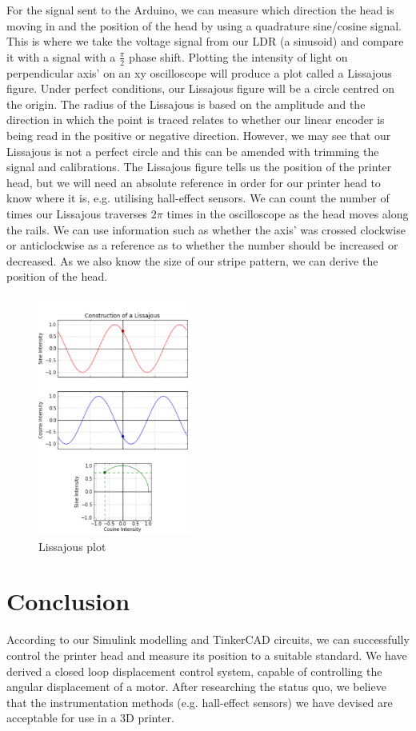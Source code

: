 \documentclass[conference]{IEEEtran}
\begin{document}
For the signal sent to the Arduino, we can measure which direction the head is moving in and the position of the head by using a quadrature sine/cosine signal. This is where we take the voltage signal from our LDR (a sinusoid) and compare it with a signal with a $\frac{\pi}{2}$ phase shift. Plotting the intensity of light on perpendicular axis' on an xy oscilloscope will produce a plot called a Lissajous figure. Under perfect conditions, our Lissajous figure will be a circle centred on the origin. The radius of the Lissajous is based on the amplitude and the direction in which the point is traced relates to whether our linear encoder is being read in the positive or negative direction. However, we may see that our Lissajous is not a perfect circle and this can be amended with trimming the signal and calibrations. The Lissajous figure tells us the position of the printer head, but we will need an absolute reference in order for our printer head to know where it is, e.g. utilising hall-effect sensors. We can count the number of times our Lissajous traverses $2\pi$ times in the oscilloscope as the head moves along the rails. We can use information such as whether the axis' was crossed clockwise or anticlockwise as a reference as to whether the number should be increased or decreased. As we also know the size of our stripe pattern, we can derive the position of the head.
\begin{figure}[htbp]
    \centerline{\includegraphics[width = 0.45\textwidth]{../img/Lissajous1.png}}
    \caption{Lissajous plot}
\end{figure}

\section*{Conclusion}
According to our Simulink modelling and TinkerCAD circuits, we can successfully control the printer head and measure its position to a suitable standard. We have derived a closed loop displacement control system, capable of controlling the angular displacement of a motor. After researching the status quo, we believe that the instrumentation methods (e.g. hall-effect sensors) we have devised are acceptable for use in a 3D printer.
\end{document}
